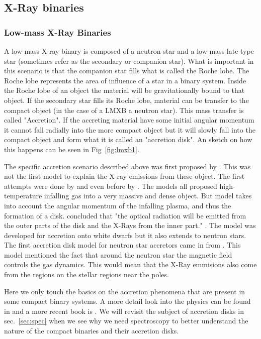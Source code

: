 \subsection{X-Ray binaries}

\subsubsection{Low-mass X-Ray Binaries}


A low-mass X-ray binary is composed of a neutron star and a low-mass late-type star (sometimes refer as the secondary or companion star). What is important in this scenario is that the companion star fills what is called the Roche lobe. The Roche lobe represents the area of influence of a star in a binary system. Inside the Roche lobe of an object the material will be gravitationally bound to that object. If the secondary star fills its Roche lobe, material can be transfer to the compact object (in the case of a LMXB a neutron star). This mass transfer is called "Accretion". If the accreting material have some initial angular momentum it cannot fall radially into the more compact object but it will slowly fall into the compact object and form what it is called an "accretion disk". An sketch on how this happens can be seen in Fig~\ref{fig:lmxb1}.

The specific accretion scenario described above was first proposed by \cite{acre68}. This was not the first model to explain the X-ray emissions from these object. The first attempts were done by \cite{shklovskii_nature_1967} and even before by \cite{hayakawa64}. The models all proposed high-temperature infalling gas into a very massive and dense object. But \cite{acre68} model takes into account the angular momentum of the infalling plasma, and thus the formation of a disk. \cite{acre68} concluded that "the optical radiation will be emitted from the outer parts of the disk and the X-Rays from the inner part." \citep{acre68}. The model was developed for accretion onto white dwarfs but it also extends to neutron stars. The first accretion disk model for neutron star accretors came in \citeyear{pringle_accretion_1972} from \citeauthor{pringle_accretion_1972}. This model mentioned the fact that around the neutron star the magnetic field controls the gas dynamics. This would mean that the X-Ray emmisions also come from the regions on the stellar regions near the poles. 

Here we only touch the basics on the accretion phenomena that are present in some compact binary systems. A more detail look into the physics can be found in \cite{pringle_accretion_1981} and a more recent book is \cite{frank_accretion_2002}. We will revisit the subject of accretion disks in sec.~\ref{sec:spec} when we see why we need spectroscopy to better understand the nature of the compact binaries and their accretion disks. 

